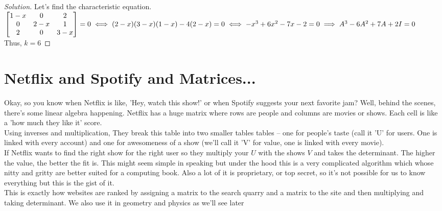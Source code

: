 \begin{proof}
    [Solution]
    Let's find the characteristic equation. \\
    $\begin{bmatrix}
        1-x &0 &2\\
        0 &2-x &1\\
        2 &0 &3-x\\
        \end{bmatrix}=0\\
        \iff (2-x)(3-x)(1-x)-4(2-x)=0\\
        \iff -x^3+6x^2-7x-2=0\\
        \implies A^3-6A^2+7A+2I=0$\\
        Thus, $k=6$
\end{proof}
\section{Netflix and Spotify and Matrices...}
Okay, so you know when Netflix is like, 'Hey, watch this show!' or when Spotify suggests your next favorite jam? Well, behind the scenes, there's some linear algebra happening. Netflix has a huge matrix where rows are people and columns are movies or shows. Each cell is like a 'how much they like it' score. \\
Using inverses and multiplication, They break this table into two smaller tables tables – one for people's taste (call it 'U' for users. One is linked with every account) and one for awesomeness of a show (we'll call it 'V' for value, one is linked with every movie). \\
If Netflix wants to find the right show for the right user so they multiply your $U$ with the shows $V$ and takes the determinant. The higher the value, the better the fit is. This might seem simple in speaking but under the hood this is a very complicated algorithm which whose nitty and gritty are better suited for a computing book. Also a lot of it is proprietary, or top secret, so it's not possible for us to know everything but this is the gist of it.\\
This is exactly how websites are ranked by assigning a matrix to the search quarry and a matrix to the site and then multiplying and taking determinant. We also use it in geometry and physics as we'll see later\\
